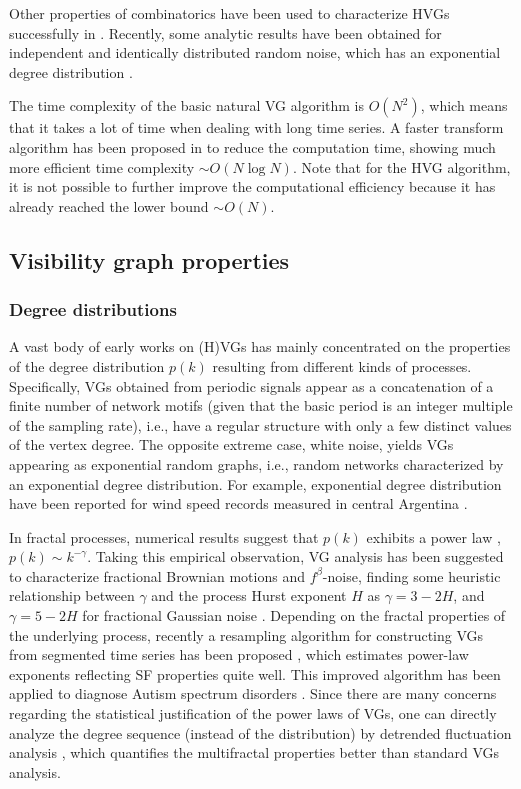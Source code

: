 		Other properties of combinatorics have been used to characterize HVGs successfully in \cite{Gutin2011}. Recently, some analytic results have been obtained for independent and identically distributed random noise, which has an exponential degree distribution \cite{Wang2018}. 

		The time complexity of the basic natural VG algorithm is $O(N^2)$, which means that it takes a lot of time when dealing with long time series. A faster transform algorithm has been proposed in \cite{Lan2015a} to reduce the computation time, showing much more efficient time complexity $\sim O(N \log N)$. Note that for the HVG algorithm, it is not possible to further improve the computational efficiency because it has already reached the lower bound $\sim O(N)$. 
		
	\subsection{Visibility graph properties}
		\subsubsection{Degree distributions}
		A vast body of early works on (H)VGs has mainly concentrated on the properties of the degree distribution $p(k)$ resulting from different kinds of processes. Specifically, VGs obtained from periodic signals appear as a concatenation of a finite number of network motifs (given that the basic period is an integer multiple of the sampling rate), i.e., have a regular structure with only a few distinct values of the vertex degree. The opposite extreme case, white noise, yields VGs appearing as exponential random graphs, i.e., random networks characterized by an exponential degree distribution. For example, exponential degree distribution have been reported for wind speed records measured in central Argentina \cite{Pierini2012}. 
		
		In fractal processes, numerical results suggest that $p(k)$ exhibits a power law \cite{Lacasa2008}, $p(k) \sim k^{-\gamma}$. Taking this empirical observation, VG analysis has been suggested to characterize fractional Brownian motions and $f^{\beta}$-noise, finding some heuristic relationship between $\gamma$ and the process Hurst exponent $H$ as $\gamma = 3 - 2H$, and $\gamma = 5 - 2H$ for fractional Gaussian noise \cite{Lacasa2009,Ni2009}. Depending on the fractal properties of the underlying process, recently a resampling algorithm for constructing VGs from segmented time series has been proposed \cite{Ahmadlou2012}, which estimates power-law exponents reflecting SF properties quite well. This improved algorithm has been applied to diagnose Autism spectrum disorders \cite{Ahmadlou2012}. Since there are many concerns regarding the statistical justification of the power laws of VGs, one can directly analyze the degree sequence (instead of the distribution) by detrended fluctuation analysis \cite{Czechowski2016}, which quantifies the multifractal properties better than standard VGs analysis.  
	
